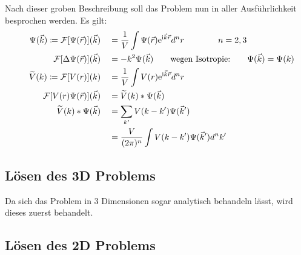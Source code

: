 Nach dieser groben Beschreibung soll das Problem nun in aller Ausführlichkeit besprochen werden. Es gilt: 
\begin{alignat*}{3}
&& \Psi(\vec{k})\coloneqq \mathcal{F}[\Psi(\vec{r})](\vec{k}) && &= \frac{1}{V}\int \Psi(\vec{r})\text{e} ^{\text{i}\vec{k}\vec{r}}d^n r \qquad\qquad n=2,3 \\
&& \mathcal{F}[\Delta \Psi(\vec{r})](\vec{k}) && &= -k^2\Psi(\vec{k}) \qquad \text{wegen Isotropie:}\qquad \Psi(\vec{k})=\Psi(k)\\
&& \widetilde{V}(k)\coloneqq \mathcal{F}[V(r)](k) && &= \frac{1}{V}\int V(r)\text{e} ^{\text{i}\vec{k}\vec{r}}d^n r  \\
&& \mathcal{F}[V(r)\Psi(\vec{r})](\vec{k}) && &=\widetilde{V}(k)*\Psi(\vec{k}) \ \\
&& \widetilde{V}(k)*\Psi(\vec{k})  && &= \sum\limits_{k'} {V}(k-k')\Psi(\vec{k} ') \\
&& && &= \frac{V}{(2\pi)^n}\int {V}(k-k')\Psi(\vec{k} ') d^n k'
\end{alignat*}
\subsection{Lösen des 3D Problems}
Da sich das Problem in 3 Dimensionen sogar analytisch behandeln lässt, wird dieses zuerst behandelt. 
\subsection{Lösen des 2D Problems}
